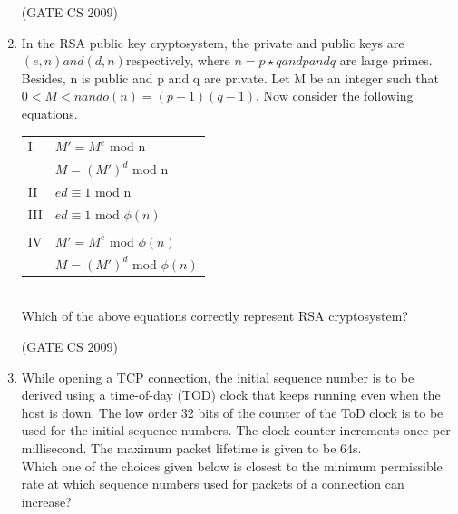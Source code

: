 \documentclass[a4paper, 11pt]{article}
\begin{document}
\begin{enumerate}
    \hfill (GATE CS 2009)

    \item In the RSA public key cryptosystem, the private and public keys are $(e, n) and (d, n)$respectively, where $n=p\star q and p and q$ are large primes. Besides, n is public and p and q are private. Let M be an integer such that $0<M<n and o(n)=(p-1)(q-1)$. Now consider the following equations.\\
    \begin{tabular}{ll}
        I & $M' = M^e$  mod n\\
         & $M = (M')^d$ mod n\\
        II & $ed \equiv 1 $ mod n\\
        III & $ed \equiv 1 $ mod $\phi(n)$\\ \\
        IV & $M' = M^e$  mod $\phi(n)$\\
           & $M = (M')^d$  mod $\phi(n)$\\
    \end{tabular}\\
    Which of the above equations correctly represent RSA cryptosystem?

    \begin{enumerate}
    \end{enumerate}

    \hfill (GATE CS 2009)
    
     \item While opening a TCP connection, the initial sequence number is to be derived using a time-of-day (TOD) clock that keeps running even when the host is down. The low order 32 bits of the counter of the ToD clock is to be used for the initial sequence numbers. The clock counter increments once per millisecond. The maximum packet lifetime is given to be 64s.\\
    Which one of the choices given below is closest to the minimum permissible rate at which sequence numbers used for packets of a connection can increase?
    \begin{enumerate}
    \end{enumerate}
    

\end{enumerate}
\end{document}
